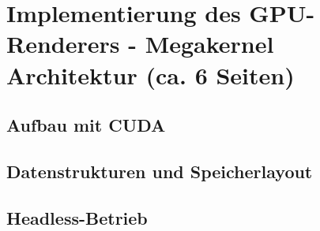 \section{Implementierung des GPU-Renderers - Megakernel Architektur (ca. 6 Seiten)}
\subsection{Aufbau mit CUDA}
\subsection{Datenstrukturen und Speicherlayout}
\subsection{Headless-Betrieb}

